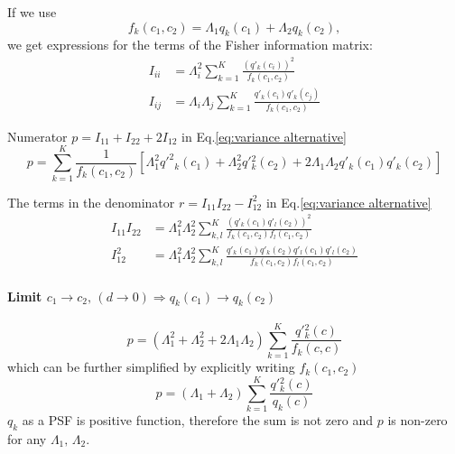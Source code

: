 If we use 
%
\begin{equation}
	f_k(c_1,c_2)=\Lambda_1q_k(c_1)+\Lambda_2q_k(c_2),
\end{equation}
%
we get expressions for the terms of the Fisher information matrix:
\begin{equation}
	\begin{aligned}I_{ii} & =\Lambda_i^2\sum_{k=1}^{K}\frac{\left(q'_k(c_i)\right)^2}{f_k(c_1,c_2)}\\
		I_{ij} & =\Lambda_i\Lambda_j\sum_{k=1}^{K}\frac{q'_k(c_i)q'_k(c_j)}{f_k(c_1,c_2)}
	\end{aligned}
	\label{eq:Fisher Information alternative - Individual}
\end{equation}
 
Numerator $p=I_{11}+I_{22}+2I_{12}$ in Eq.\ref{eq:variance alternative}
\begin{equation}
	p=\sum_{k=1}^{K}\frac{1}{f_k(c_1,c_2)}\left[\Lambda_1^2q'^2{}_k(c_1)+\Lambda_2^2q'{}_k^2(c_2)+2\Lambda_1\Lambda_2q'_k(c_1)q'_k(c_2)\right]
\end{equation}

The terms in the denominator $r=I_{11}I_{22}-I_{12}^2$ in Eq.\ref{eq:variance alternative}
%
\begin{equation}
	\begin{alignedat}{1}
		I_{11}I_{22} & =\Lambda_1^2\Lambda_2^2\sum_{k,l}^{K}\frac{\left(q'_k(c_1)q'_{l}(c_2)\right)^2}{f_k(c_1,c_2)f_{l}(c_1,c_2)}\\
		I_{12}^2 & =\Lambda_1^2\Lambda_2^2\sum_{k,l}^{K}\frac{q'_k(c_1)q'_k(c_2)q'_{l}(c_1)q'_{l}(c_2)}{f_k(c_1,c_2)f_{l}(c_1,c_2)}
	\end{alignedat}
\end{equation}

\paragraph*{Limit $c_1\rightarrow c_2,\,(d\rightarrow0)\Rightarrow q_k(c_1)\rightarrow q_k(c_2)$}
%
\begin{equation}
	p=(\Lambda_1^2+\Lambda_2^2+2\Lambda_1\Lambda_2)\sum_{k=1}^{K}\frac{q'{}_k^2(c)}{f_k(c,c)}
\end{equation}
%
which can be further simplified by explicitly writing $f_k(c_1,c_2)$
%
\begin{equation}
	p=(\Lambda_1+\Lambda_2)\sum_{k=1}^{K}\frac{q'{}_k^2(c)}{q_k(c)}
\end{equation}
%
$q_k$ as a PSF is positive function, therefore the sum is not zero and $p$ is non-zero for any $\Lambda_1,\,\Lambda_2$. 

